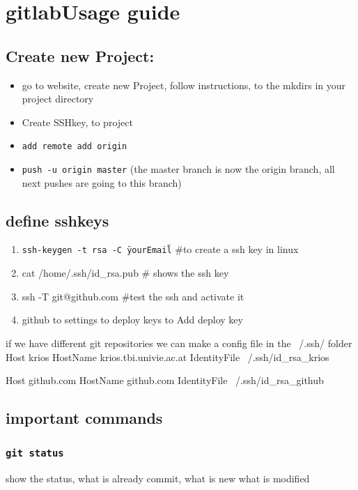 \documentclass[ twoside,openright,titlepage,numbers=noenddot,headinclude,%
                footinclude=true, cleardoublepage=empty,abstractoff, %
                BCOR=5mm,paper=a4,fontsize=11pt,%
                ]{scrreprt}
\begin{document}
\chapter{gitlabUsage guide}
\section{Create new Project:}

\begin{itemize}
	\item go to website, create new Project, follow instructions, to the mkdirs in  your project directory
	\item Create SSHkey, to project
	\item \texttt{add remote add origin}
	\item \texttt{push -u origin master}    (the master branch is now the origin branch, all next pushes are going to this branch)
\end{itemize}

\section{define sshkeys}

\begin{enumerate}
\item \texttt{ssh-keygen -t rsa -C \"yourEmail\"} \#to create a ssh key in linux
\item cat /home/.ssh/id\_rsa.pub   \# shows the ssh key
\item ssh -T git@github.com  \#test the ssh and activate it
\item github to settings to deploy keys to Add deploy key
\end{enumerate}

if we have different git repositories we can make a config file in the 
~/.ssh/ folder
Host krios
HostName krios.tbi.univie.ac.at
IdentityFile ~/.ssh/id\_rsa\_krios

Host github.com
HostName github.com
IdentityFile ~/.ssh/id\_rsa\_github




\section{important commands}
\subsection{\texttt{git status}}
	show the status, what is already commit, what is new what is modified
\end{document}
